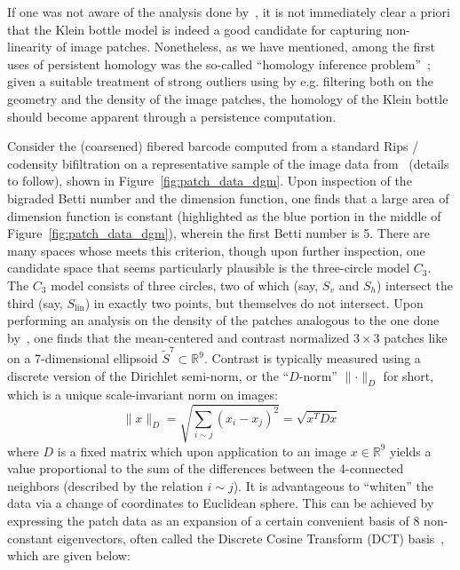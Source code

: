 \documentclass{article} %
\begin{document}
If one was not aware of the analysis done by~\cite{lee2003nonlinear, hateren_schaaf_1998, carlsson2008local, perea2014klein}, it is not immediately clear a priori that the Klein bottle model is indeed a good candidate for capturing non-linearity of image patches. Nonetheless, as we have mentioned, among the first uses of persistent homology was the so-called ``homology inference problem''~\cite{perea2018brief}; given a suitable treatment of strong outliers using by e.g. filtering both on the geometry and the density of the image patches, the homology of the Klein bottle should become apparent through a persistence computation.
 
Consider the (coarsened) fibered barcode computed from a standard Rips / codensity bifiltration on a representative sample of the image data from~\cite{hateren_schaaf_1998} (details to follow), shown in Figure~\ref{fig:patch_data_dgm}. 
Upon inspection of the bigraded Betti number and the dimension function, one finds that a large area of dimension function is constant (highlighted as the blue portion in the middle of Figure~\ref{fig:patch_data_dgm}), wherein the first Betti number is 5. There are many spaces whose  meets this criterion, though upon further inspection, one candidate space that seems particularly plausible is the three-circle model $C_3$. The $C_3$ model consists of three circles, two of which (say, $S_v$ and $S_h$) intersect the third (say, $S_\mathrm{lin}$) in exactly two points, but themselves do not intersect. Upon performing an analysis on the density of the patches analogous to the one done by~\cite{lee2003nonlinear}, one finds that the mean-centered and contrast normalized $3 \times 3$ patches like on a 7-dimensional ellipsoid $\tilde{S}^7 \subset \mathbb{R}^9$. Contrast is typically measured using a discrete version of the Dirichlet semi-norm, or the ``$D$-norm'' $\lVert \cdot \rVert_D$ for short, which is a unique scale-invariant norm on images:
$$ \lVert x \rVert_D = \sqrt{\sum_{i \sim j}(x_i - x_j)^2} = \sqrt{x^T D x}$$
where $D$ is a fixed matrix which upon application to an image $x \in \mathbb{R}^9$ yields a value proportional to the sum of the differences between the 4-connected neighbors (described by the relation $i \sim j$). It is advantageous to ``whiten'' the data via a change of coordinates to Euclidean sphere. 
This can be achieved by expressing the patch data as an expansion of a certain convenient basis of 8 non-constant eigenvectors, often called the Discrete Cosine Transform (DCT) basis~\cite{lee2003nonlinear}, which are given below: 
\end{document}
